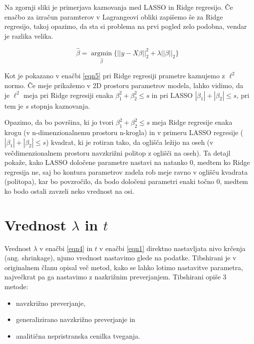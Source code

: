 \documentclass[onecolumn]{report}
\begin{document}
Na zgornji sliki je primerjava kaznovanja med LASSO in Ridge regresijo. Če enačbo za izračun paramterov v Lagrangeovi obliki zapišemo še za Ridge regresijo, takoj opazimo, da sta si problema na prvi pogled zelo podobna, vendar je razlika velika.

\begin{equation}
	\hat{\beta} =  \underset{\hat{\beta}}{\operatorname{argmin}} \{ ||y - X\beta||_2^2 + \lambda ||\beta||_2 \}
	\label{eqn5} 
\end{equation}

Kot je pokazano v enačbi \eqref{eqn5} pri Ridge regresiji prametre kaznujemo z $\ell^2$ normo. Če meje prikažemo v 2D prostoru parametrov modela, lahko vidimo, da je $\ell^2$ meja pri Ridge regresiji enaka $\beta_1^2 +\beta_2^2 \leq s$ in pri LASSO $|\beta_1| + |\beta_2| \leq s$, pri tem je $s$ stopnja kaznovanja. 

Opazimo, da bo površina, ki jo tvori $\beta_1^2 +\beta_2^2 \leq s$ meja Ridge regresije enaka krogu (v n-dimenzionalnemu prostoru n-krogla) in v primeru LASSO regresije ($|\beta_1| + |\beta_2| \leq s$) kvadrat, ki je rotiran tako, da oglišča ležijo na oseh (v večdimenzionalnem prostoru navzkrižni politop z oglišči na oseh). Ta detajl pokaže, kako LASSO določene parametre nastavi na natanko 0, medtem ko Ridge regresija ne, saj bo kontura parametrov zadela rob meje ravno v oglišču kvadrata (politopa), kar bo povzročilo, da bodo določeni parametri enaki točno 0, medtem ko bodo ostali zavzeli neko vrednost na osi.

\section*{Vrednost $\lambda$ in $t$}

Vrednost $\lambda$ v enačbi \eqref{eqn4} in $t$ v enačbi \eqref{eqn1} direktno nastavljata nivo krčenja (ang. shrinkage), njuno vrednost nastavimo glede na podatke. Tibshirani je v originalnem članu opisal več metod, kako se lahko lotimo nastavitve parametra, največkrat pa ga nastavimo z nazkrižnim preverjanjem. Tibshirani opiše 3 metode:

\begin{itemize}
	\item navzkrižno preverjanje,
	\item generalizirano navzkrižno preverjanje in
	\item analitična nepristranska cenilka tveganja.
\end{itemize}
\end{document}
